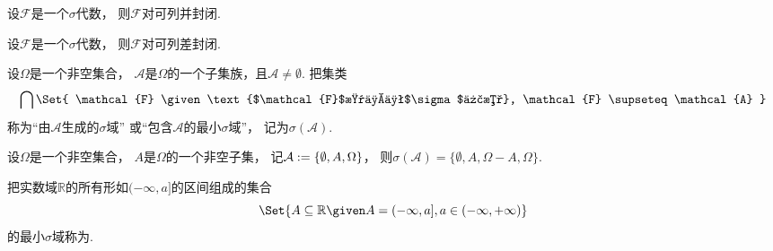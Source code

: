 \begin{property}
设\(\mathcal{F}\)是一个\(\sigma\)代数，
则\(\mathcal{F}\)对可列并封闭.
\end{property}

\begin{property}
设\(\mathcal{F}\)是一个\(\sigma\)代数，
则\(\mathcal{F}\)对可列差封闭.
\end{property}

\begin{definition}
设\(\Omega\)是一个非空集合，
\(\mathcal{A}\)是\(\Omega\)的一个子集族，且\(\mathcal{A}\neq\emptyset\).
把集类\begin{equation*}
	\bigcap\Set{
		\mathcal{F}
		\given
		\text{$\mathcal{F}$是一个$\sigma$代数},
		\mathcal{F} \supseteq \mathcal{A}
	}
\end{equation*}
称为“由\(\mathcal{A}\)生成的\(\sigma\)域”
或“包含\(\mathcal{A}\)的最小\(\sigma\)域”，
记为\(\sigma(\mathcal{A})\).
\end{definition}

\begin{example}
设\(\Omega\)是一个非空集合，
\(A\)是\(\Omega\)的一个非空子集，
记\(\mathcal{A} := \{\emptyset,A,\Omega\}\)，
则\(\sigma(\mathcal{A}) = \{\emptyset,A,\Omega-A,\Omega\}\).
\end{example}

\begin{definition}
把实数域\(\mathbb{R}\)的所有形如\((-\infty,a]\)的区间组成的集合\begin{equation*}
	\Set{
		A \subseteq \mathbb{R}
		\given
		A = (-\infty,a],
		a \in (-\infty,+\infty)
	}
\end{equation*}
的最小\(\sigma\)域称为.
\end{definition}

